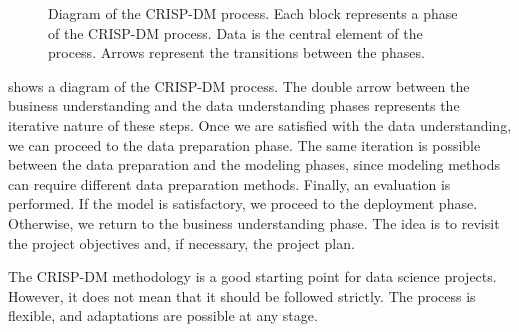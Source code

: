 \begin{figure}
  \centering
  \caption{
  Diagram of the CRISP-DM process.
  Each block represents a phase of the CRISP-DM process.  Data is the central element of
  the process.  Arrows represent the transitions between the phases.
  }
  \label{fig:cripdm}
\end{figure}

 shows a diagram of the CRISP-DM process.  The double arrow between the
business understanding and the data understanding phases represents the iterative nature
of these steps.  Once we are satisfied with the data understanding, we can proceed to
the data preparation phase.  The same iteration is possible between the data preparation
and the modeling phases, since modeling methods can require different data preparation
methods. Finally, an evaluation is performed.  If the model is satisfactory, we proceed to the
deployment phase.  Otherwise, we return to the business understanding phase.  The idea
is to revisit the project objectives and, if necessary, the project plan.

The CRISP-DM methodology is a good starting point for data science projects.  However, it
does not mean that it should be followed strictly.  The process is flexible, and
adaptations are possible at any stage.

